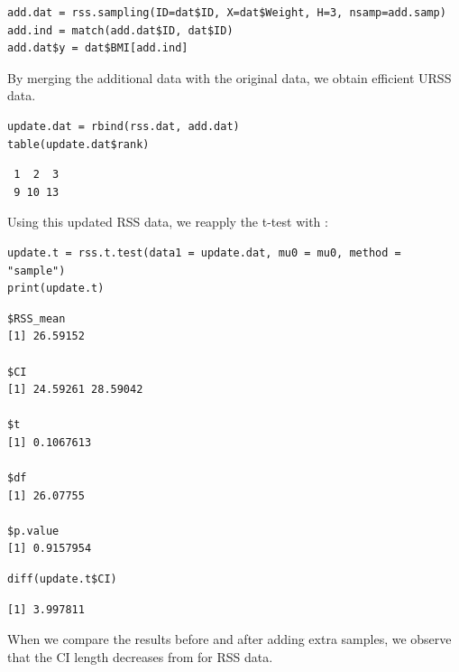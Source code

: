\begin{verbatim}
add.dat = rss.sampling(ID=dat$ID, X=dat$Weight, H=3, nsamp=add.samp)
add.ind = match(add.dat$ID, dat$ID)
add.dat$y = dat$BMI[add.ind]
\end{verbatim}

%
By merging the additional data with the original data, we obtain efficient URSS data.
%

\begin{verbatim}
update.dat = rbind(rss.dat, add.dat)
table(update.dat$rank) 
\end{verbatim}
\begin{verbatim}
 1  2  3 
 9 10 13
\end{verbatim}

%
Using this updated RSS data, we reapply the t-test with :
%

\begin{verbatim}
update.t = rss.t.test(data1 = update.dat, mu0 = mu0, method = "sample")
print(update.t)
\end{verbatim}
\begin{verbatim}
$RSS_mean
[1] 26.59152

$CI
[1] 24.59261 28.59042

$t
[1] 0.1067613

$df
[1] 26.07755

$p.value
[1] 0.9157954
\end{verbatim}
\begin{verbatim}
diff(update.t$CI) 
\end{verbatim}
\begin{verbatim}
[1] 3.997811
\end{verbatim}

%
When we compare the results before and after adding extra samples, we observe that the CI length decreases from  for RSS data.

